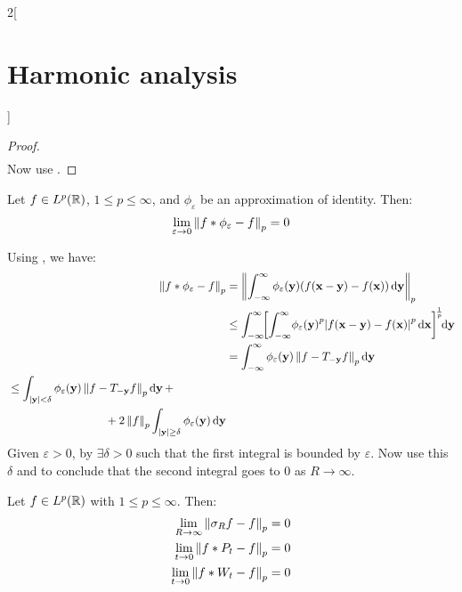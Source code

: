 \documentclass[../../../main_math.tex]{subfiles}
\begin{document}
\begin{multicols}{2}[\section{Harmonic analysis}]
\begin{proof}
\begin{align*}
    \end{align*}
    Now use .
  \end{proof}
  \begin{theorem}\label{HA:kernelConvLp}
    Let $f\in L^p(\mathbb{R})$, $1\leq p\leq\infty$, and $\phi_\varepsilon$ be an approximation of identity. Then:
    \begin{equation*}
      \lim_{\varepsilon\to 0}\left\|f*\phi_\varepsilon-f\right\|_p =0 \\
    \end{equation*}
  \end{theorem}
  \begin{sproof}
    Using , we have:
    \begin{align*}
      \norm{f*\phi_\varepsilon-f}_p & =\norm{\int_{-\infty}^{\infty}\phi_\varepsilon(\vf{y})(f(\vf{x}-\vf{y})-f(\vf{x}))\dd{\vf{y}}}_p                                                                                \\
                                    & \leq\int_{-\infty}^{\infty}\!\!{\left[\int_{-\infty}^{\infty}\!{\phi_\varepsilon(\vf{y})}^p\abs{f(\vf{x}-\vf{y})-f(\vf{x})}^p\dd{\vf{x}}\right]}^{\!\frac{1}{p}}\!\!\dd{\vf{y}} \\
                                    & = \int_{-\infty}^{\infty}\phi_\varepsilon(\vf{y})\norm{f-T_{-\vf{y}}f}_p\dd{\vf{y}}                                                                                             \\
      \begin{split}
        & \leq \int_{\abs{\vf{y}}< \delta}\phi_\varepsilon(\vf{y})\norm{f-T_{-\vf{y}}f}_p\dd{\vf{y}}+\\
        &\hspace{3cm}+2\norm{f}_p\int_{\abs{\vf{y}}\geq\delta}\phi_\varepsilon(\vf{y})\dd{\vf{y}}
      \end{split}
    \end{align*}
    Given $\varepsilon>0$, by  $\exists\delta>0$ such that the first integral is bounded by $\varepsilon$. Now use this $\delta$ and  to conclude that the second integral goes to 0 as $R\to\infty$.
  \end{sproof}
  \begin{corollary}
    Let $f\in L^p(\mathbb{R})$ with $1\leq p\leq\infty$. Then:
    \begin{align*}
      \lim_{R\to\infty}\left\|\sigma_Rf-f\right\|_p & =0 \\
      \lim_{t\to 0}\left\|f*P_t-f\right\|_p         & =0 \\
      \lim_{t\to 0}\left\|f*W_t-f\right\|_p         & =0
    \end{align*}
  \end{corollary}

\end{multicols}
\end{document}
